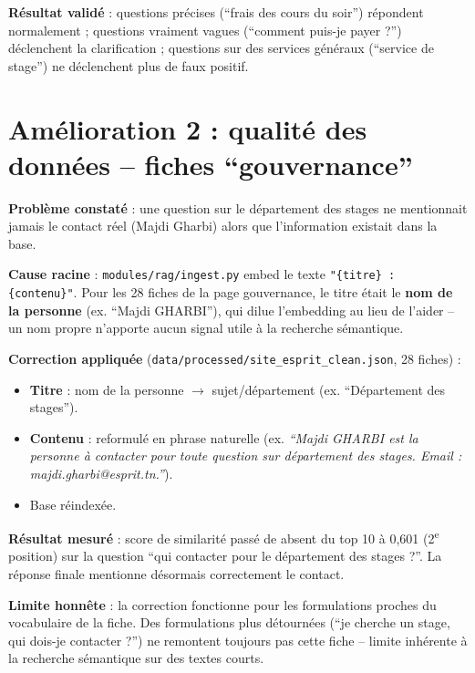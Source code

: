 \documentclass[11pt,a4paper]{report}
\begin{document}
\textbf{Résultat validé} : questions précises (``frais des cours du soir'') répondent
normalement ; questions vraiment vagues (``comment puis-je payer ?'') déclenchent la
clarification ; questions sur des services généraux (``service de stage'') ne
déclenchent plus de faux positif.

\section{Amélioration 2 : qualité des données -- fiches ``gouvernance''}
\textbf{Problème constaté} : une question sur le département des stages ne mentionnait
jamais le contact réel (Majdi Gharbi) alors que l'information existait dans la base.

\textbf{Cause racine} : \texttt{modules/rag/ingest.py} embed le texte
\texttt{"\{titre\} : \{contenu\}"}. Pour les 28 fiches de la page gouvernance, le titre
était le \textbf{nom de la personne} (ex. ``Majdi GHARBI''), qui dilue l'embedding au lieu
de l'aider -- un nom propre n'apporte aucun signal utile à la recherche sémantique.

\textbf{Correction appliquée} (\texttt{data/processed/site\_esprit\_clean.json},
28 fiches) :
\begin{itemize}
    \item \textbf{Titre} : nom de la personne $\to$ sujet/département (ex.
    ``Département des stages'').
    \item \textbf{Contenu} : reformulé en phrase naturelle (ex. \emph{``Majdi GHARBI est
    la personne à contacter pour toute question sur département des stages. Email :
    majdi.gharbi@esprit.tn.''}).
    \item Base réindexée.
\end{itemize}

\textbf{Résultat mesuré} : score de similarité passé de absent du top 10 à 0{,}601 (2\textsuperscript{e}
position) sur la question ``qui contacter pour le département des stages ?''. La réponse
finale mentionne désormais correctement le contact.

\begin{noteinfo}
\textbf{Limite honnête} : la correction fonctionne pour les formulations proches du
vocabulaire de la fiche. Des formulations plus détournées (``je cherche un stage, qui
dois-je contacter ?'') ne remontent toujours pas cette fiche -- limite inhérente à la
recherche sémantique sur des textes courts.
\end{noteinfo}
\end{document}
